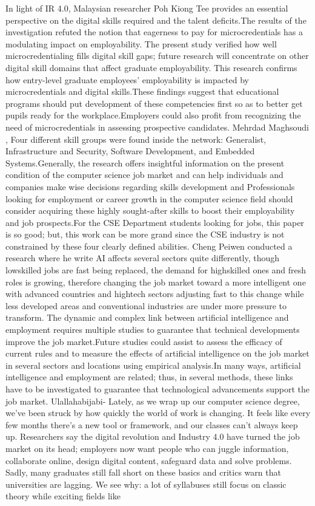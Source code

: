 \documentclass[final,5p,times,twocolumn]{elsarticle}
\begin{document}
In light of IR 4.0, Malaysian researcher Poh Kiong Tee \cite{M1_tee2024bridging} provides an essential perspective on the digital skills required and the talent deficits.The results of the investigation refuted the notion that eagerness to pay for microcredentials has a modulating impact on employability. The present study verified how well microcredentialing fills digital skill gaps; future research will concentrate on other digital skill domains that affect graduate employability. This research confirms how entry-level graduate employees' employability is impacted by microcredentials and digital skills.These findings suggest that educational programs should put development of these competencies first so as to better get pupils ready for the workplace.Employers could also profit from recognizing the need of microcredentials in assessing prospective candidates. Mehrdad Maghsoudi \cite{M2_maghsoudi2024uncovering}, Four different skill groups were found inside the network: Generalist, Infrastructure and Security, Software Development, and Embedded Systems.Generally, the research offers insightful information on the present condition of the computer science job market and can help individuals and companies make wise decisions regarding skills development and Professionals looking for employment or career growth in the computer science field should consider acquiring these highly sought-after skills to boost their employability and job prospects.For the CSE Department students looking for jobs, this paper is so good; but, this work can be more grand since the CSE industry is not constrained by these four clearly defined abilities. Cheng Peiwen \cite{M3_peiwen2025impact} conducted a research where he write AI affects several sectors quite differently, though lowskilled jobs are fast being replaced, the demand for highskilled ones and fresh roles is growing, therefore changing the job market toward a more intelligent one with advanced countries and hightech sectors adjusting fast to this change while less developed areas and conventional industries are under more pressure to transform. The dynamic and complex link between artificial intelligence and employment requires multiple studies to guarantee that technical developments improve the job market.Future studies could assist to assess the efficacy of current rules and to measure the effects of artificial intelligence on the job market in several sectors and locations using empirical analysis.In many ways, artificial intelligence and employment are related; thus, in several methods, these links have to be investigated to guarantee that technological advancements support the job market. Ulallahabijabi- Lately, as we wrap up our computer science degree, we've been struck by how quickly the world of work is changing. It feels like every few months there's a new tool or framework, and our classes can't always keep up. Researchers say the digital revolution and Industry 4.0 have turned the job market on its head; employers now want people who can juggle information, collaborate online, design digital content, safeguard data and solve problems. Sadly, many graduates still fall short on these basics and critics warn that universities are lagging. We see why: a lot of syllabuses still focus on classic theory while exciting fields like 
\end{document}
